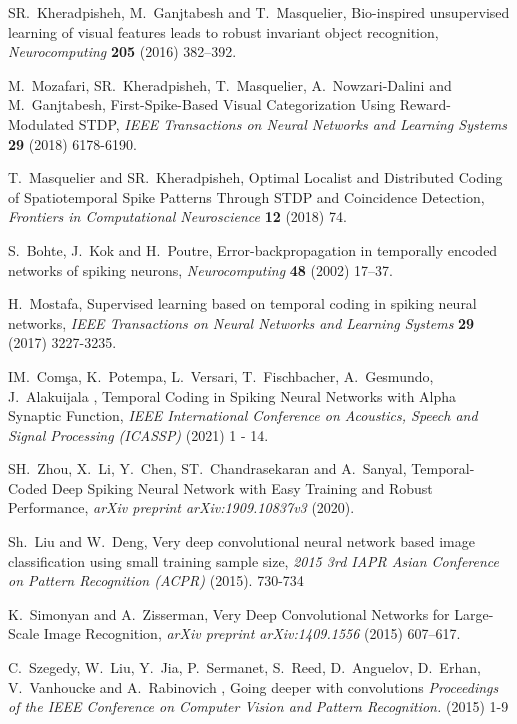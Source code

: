 \documentclass[preprint,twocolumn,5p,12pt]{article}
\begin{document}
\begin{singlespace}


\begin{thebibliography}{10}

SR.~Kheradpisheh, M.~Ganjtabesh and T.~Masquelier, Bio-inspired unsupervised learning of visual features leads to robust invariant object recognition, {\em Neurocomputing} {\bf 205}  (2016)
  382--392.

M.~Mozafari, SR.~Kheradpisheh, T.~Masquelier, A.~Nowzari-Dalini and M.~Ganjtabesh, First-Spike-Based Visual Categorization Using Reward-Modulated STDP, {\em IEEE Transactions on Neural Networks and Learning Systems} {\bf 29}  (2018) 
  6178-6190.

 T.~Masquelier and SR.~Kheradpisheh, Optimal Localist and Distributed Coding of Spatiotemporal Spike Patterns Through STDP and Coincidence Detection, {\em Frontiers in Computational Neuroscience}  {\bf 12} (2018) 74.

S.~Bohte, J.~Kok and H.~Poutre, Error-backpropagation in temporally encoded networks of spiking neurons, {\em Neurocomputing} {\bf 48}  (2002)
  17--37.

H.~Mostafa, Supervised learning based on temporal coding in spiking neural networks, {\em IEEE Transactions on Neural Networks and Learning Systems} {\bf 29}  (2017) 
  3227-3235.

IM.~Comşa, K.~Potempa, L.~Versari, T.~Fischbacher, A.~Gesmundo, J.~Alakuijala , Temporal Coding in Spiking Neural Networks with Alpha Synaptic Function, {\em IEEE International Conference on Acoustics, Speech and Signal Processing (ICASSP)}  (2021)  1 - 14.

SH.~Zhou, X.~Li, Y.~Chen, ST.~Chandrasekaran and A.~Sanyal, Temporal-Coded Deep Spiking Neural Network with Easy Training and Robust Performance, {\em arXiv preprint arXiv:1909.10837v3}   (2020).

Sh.~Liu and W.~Deng, Very deep convolutional neural network based image classification using small training sample size, {\em 2015 3rd IAPR Asian Conference on Pattern Recognition (ACPR)}   (2015). 
  730-734

K.~Simonyan and A.~Zisserman, Very Deep Convolutional Networks for Large-Scale Image Recognition, {\em arXiv preprint arXiv:1409.1556}  (2015)  607--617.

C.~Szegedy, W.~Liu, Y.~Jia, P.~Sermanet, S.~Reed, D.~Anguelov, D.~Erhan, V.~Vanhoucke and A.~Rabinovich , Going deeper with convolutions  {\em Proceedings of the IEEE Conference on Computer Vision and Pattern Recognition. } (2015)  1-9


\end{thebibliography}
\end{singlespace}
\end{document}
